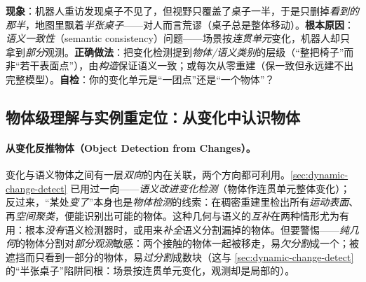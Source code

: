 \begin{pitfall}
\textbf{现象}：机器人重访发现桌子不见了，但视野只覆盖了桌子一半，于是只删掉\emph{看到的那半}，地图里飘着\emph{半张桌子}——对人而言荒谬（桌子总是整体移动）。\textbf{根本原因}：\emph{语义一致性}（semantic consistency）问题——场景按\emph{连贯单元}变化，机器人却只拿到\emph{部分}观测。\textbf{正确做法}：把变化检测提到\emph{物体/语义类别}的层级（“整把椅子”而非“若干表面点”），由\emph{构造}保证语义一致；或每次从零重建（保一致但永远建不出完整模型）。\textbf{自检}：你的变化单元是“一团点”还是“一个物体”？
\end{pitfall}

\subsection{物体级理解与实例重定位：从变化中认识物体}
\label{sec:dynamic-object-understanding}

\paragraph{从变化反推物体（Object Detection from Changes）。}
变化与语义物体之间有一层\emph{双向}的内在关联，两个方向都可利用\cite{schmid2026dynamic}。\cref{sec:dynamic-change-detect} 已用过一向——\emph{语义改进变化检测}（物体作连贯单元整体变化）；反过来，“某处\emph{变了}”本身也是\emph{物体检测}的线索：在稠密重建里检出所有\emph{运动表面}、再\emph{空间聚类}，便能识别出可能的物体。这种几何与语义的\emph{互补}在两种情形尤为有用：根本\emph{没有}语义检测器时，或用来\emph{补全}语义分割漏掉的物体。但要警惕——\emph{纯几何}的物体分割对\emph{部分观测}敏感：两个接触的物体一起被移走，易\emph{欠分割}成一个；被遮挡而只看到一部分的物体，易\emph{过分割}成数块（这与 \cref{sec:dynamic-change-detect} 的“半张桌子”陷阱同根：场景按连贯单元变化，观测却是局部的）。

